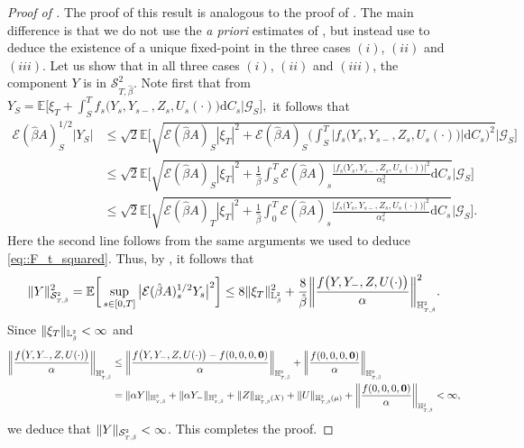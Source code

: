 \documentclass[10pt]{article} %
\newcommand\cE{\mathcal E}
\newcommand\cG{\mathcal G}
\newcommand\cS{\mathcal S}
\newcommand{\smalltext}[1]{\text{\fontsize{4}{4}\selectfont$#1$}}
\def \E{\mathbb{E}}
\def \H{\mathbb{H}}
\def \L{\mathbb{L}}
\newcommand{\1}{\mathbf{1}}
\def\d{\mathrm{d}}
\begin{document}
\begin{proof}[Proof of ]
	The proof of this result is analogous to the proof of . The main difference is that we do not use the \emph{a priori} estimates of , but instead use  to deduce the existence of a unique fixed-point in the three cases $(i)$, $(ii)$ and $(iii)$. Let us show that in all three cases $(i)$, $(ii)$ and $(iii)$, the component $Y$ is in $\cS^2_{T,\hat\beta}$. Note first that from $Y_S = \E\big[\xi_T + \int_S^T f_s\big(Y_s,Y_{s-},Z_s,U_s(\cdot)\big)\d C_s \big| \cG_S\big],$ it follows that
	\begin{align*}
		\cE(\hat\beta A)^{1/2}_S|Y_S| 
		&\leq \sqrt{2}\E\Bigg[\sqrt{\cE(\hat\beta A)_S|\xi_T|^2 + \cE(\hat\beta A)_S\bigg(\int_S^T  \big|f_s\big(Y_s,Y_{s-},Z_s,U_s(\cdot)\big)\big|\d C_s\bigg)^2} \Bigg| \cG_S\Bigg] \\
		&\leq \sqrt{2}\E\Bigg[\sqrt{\cE(\hat\beta A)_S|\xi_T|^2 + \frac{1}{\hat\beta}\int_S^T \cE(\hat\beta A)_s \frac{\big|f_s\big(Y_s,Y_{s-},Z_s,U_s(\cdot)\big)\big|^2}{\alpha^2_s}\d C_s} \Bigg| \cG_S\Bigg] \\
		&\leq \sqrt{2}\E\Bigg[\sqrt{\cE(\hat\beta A)_T|\xi_T|^2 + \frac{1}{\hat\beta}\int_0^T \cE(\hat\beta A)_s \frac{\big|f_s\big(Y_s,Y_{s-},Z_s,U_s(\cdot)\big)\big|^2}{\alpha^2_s}\d C_s} \Bigg| \cG_S\Bigg].
	\end{align*}
	Here the second line follows from the same arguments we used to deduce \eqref{eq::F_t_squared}. Thus, by , it follows that
	\begin{equation*}
		\|Y\|^2_{\cS^\smalltext{2}_{\smalltext{T}\smalltext{,}\smalltext{\hat\beta}}} 
		= \E\bigg[\sup_{s \in [0,T]}\big|\cE(\hat\beta A)^{1/2}_sY_s\big|^2\bigg] 
		\leq 8 \|\xi_T\|^2_{\L^\smalltext{2}_\smalltext{\hat\beta}} + \frac{8}{\hat\beta} \bigg\|\frac{f\big(Y,Y_-,Z,U(\cdot)\big)}{\alpha}\bigg\|^2_{\H^\smalltext{2}_{\smalltext{T}\smalltext{,}\smalltext{\hat\beta}}}.
	\end{equation*}
	Since $\|\xi_T\|_{\L^\smalltext{2}_\smalltext{\hat\beta}} < \infty$ and 
	\begin{align*}
		\bigg\|\frac{f\big(Y,Y_-,Z,U(\cdot)\big)}{\alpha}\bigg\|_{\H^\smalltext{2}_{\smalltext{T}\smalltext{,}\smalltext{\hat\beta}}} 
		&\leq \bigg\|\frac{f\big(Y,Y_-,Z,U(\cdot)\big)-f(0,0,0,\mathbf{0})}{\alpha}\bigg\|_{\H^\smalltext{2}_{\smalltext{T}\smalltext{,}\smalltext{\hat\beta}}} + \bigg\|\frac{f(0,0,0,\mathbf{0})}{\alpha}\bigg\|_{\H^\smalltext{2}_{\smalltext{T}\smalltext{,}\smalltext{\hat\beta}}} \\
		&= \|\alpha Y\|_{\H^\smalltext{2}_{\smalltext{T}\smalltext{,}\smalltext{\hat\beta}}} + \|\alpha Y_-\|_{\H^\smalltext{2}_{\smalltext{T}\smalltext{,}\smalltext{\hat\beta}}} + \|Z\|_{\H^\smalltext{2}_{\smalltext{T}\smalltext{,}\smalltext{\hat\beta}}(X)} + \|U\|_{\H^\smalltext{2}_{\smalltext{T}\smalltext{,}\smalltext{\hat\beta}}(\mu)} + \bigg\|\frac{f(0,0,0,\mathbf{0})}{\alpha}\bigg\|_{\H^\smalltext{2}_{\smalltext{T}\smalltext{,}\smalltext{\hat\beta}}} < \infty,
	\end{align*}
	we deduce that $\|Y\|_{\cS^\smalltext{2}_{\smalltext{T}\smalltext{,}\smalltext{\hat\beta}}} < \infty$. This completes the proof.
	

\end{proof}
\end{document}
